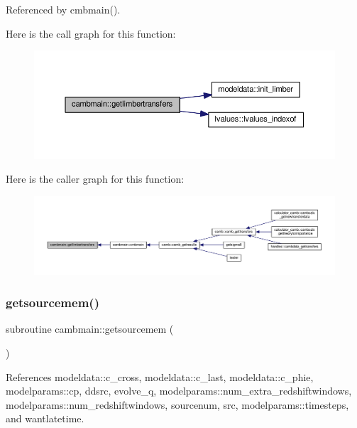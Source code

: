 Referenced by cmbmain().

Here is the call graph for this function\+:
\nopagebreak
\begin{figure}[H]
\begin{center}
\leavevmode
\includegraphics[width=350pt]{namespacecambmain_ae71666c61f08659e1870539ab6230f02_cgraph}
\end{center}
\end{figure}
Here is the caller graph for this function\+:
\nopagebreak
\begin{figure}[H]
\begin{center}
\leavevmode
\includegraphics[width=350pt]{namespacecambmain_ae71666c61f08659e1870539ab6230f02_icgraph}
\end{center}
\end{figure}
\mbox{\label{namespacecambmain_af7f170a39e21214fe3b389f74dbb183d}} 
\subsubsection{\texorpdfstring{getsourcemem()}{getsourcemem()}}
{\footnotesize\ttfamily subroutine cambmain\+::getsourcemem (\begin{DoxyParamCaption}{ }\end{DoxyParamCaption})\hspace{0.3cm}{\ttfamily [private]}}



References modeldata\+::c\+\_\+cross, modeldata\+::c\+\_\+last, modeldata\+::c\+\_\+phie, modelparams\+::cp, ddsrc, evolve\+\_\+q, modelparams\+::num\+\_\+extra\+\_\+redshiftwindows, modelparams\+::num\+\_\+redshiftwindows, sourcenum, src, modelparams\+::timesteps, and wantlatetime.



